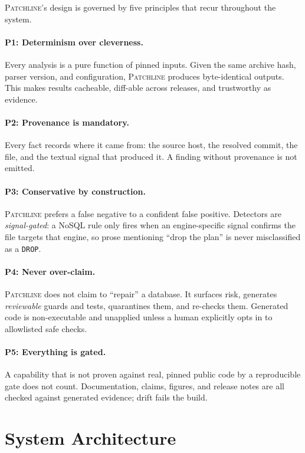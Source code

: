 \documentclass[11pt]{article}
\newcommand{\tool}{\textsc{Patchline}}
\newcommand{\code}[1]{\texttt{#1}}
\begin{document}
\tool's design is governed by five principles that recur throughout the system.

\paragraph{P1: Determinism over cleverness.} Every analysis is a pure function of pinned inputs.
Given the same archive hash, parser version, and configuration, \tool{} produces byte-identical
outputs. This makes results cacheable, diff-able across releases, and trustworthy as evidence.

\paragraph{P2: Provenance is mandatory.} Every fact records where it came from: the source host, the
resolved commit, the file, and the textual signal that produced it. A finding without provenance is
not emitted.

\paragraph{P3: Conservative by construction.} \tool{} prefers a false negative to a confident false
positive. Detectors are \emph{signal-gated}: a NoSQL rule only fires when an engine-specific signal
confirms the file targets that engine, so prose mentioning ``drop the plan'' is never misclassified
as a \code{DROP}.

\paragraph{P4: Never over-claim.} \tool{} does not claim to ``repair'' a database. It surfaces risk,
generates \emph{reviewable} guards and tests, quarantines them, and re-checks them. Generated code is
non-executable and unapplied unless a human explicitly opts in to allowlisted safe checks.

\paragraph{P5: Everything is gated.} A capability that is not proven against real, pinned public code
by a reproducible gate does not count. Documentation, claims, figures, and release notes are all
checked against generated evidence; drift fails the build.

\section{System Architecture}
\end{document}

